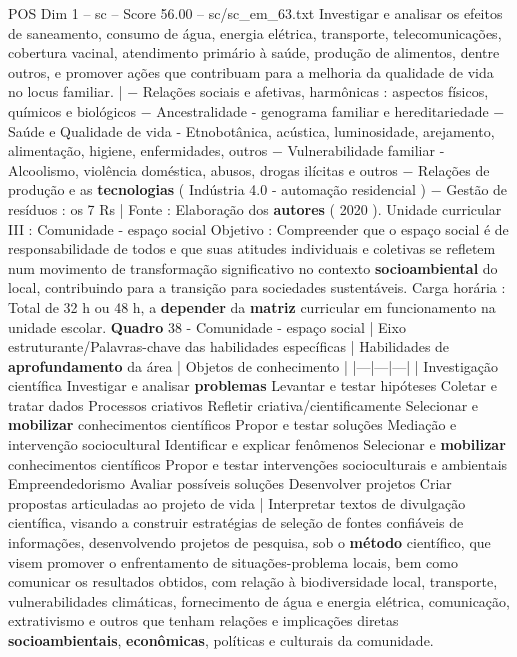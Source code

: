 \begin{textsample}{POS Dim 1 – sc – Score 56.00 – sc/sc\_em\_63.txt}
Investigar e analisar os efeitos de saneamento, consumo de água, energia elétrica, transporte, telecomunicações, cobertura vacinal, atendimento primário à saúde, produção de alimentos, dentre outros, e promover ações que contribuam para a melhoria da qualidade de vida no locus familiar. | − Relações sociais e afetivas, harmônicas : aspectos físicos, químicos e biológicos − Ancestralidade - genograma familiar e hereditariedade − Saúde e Qualidade de vida - Etnobotânica, acústica, luminosidade, arejamento, alimentação, higiene, enfermidades, outros − Vulnerabilidade familiar - Alcoolismo, violência doméstica, abusos, drogas ilícitas e outros − Relações de produção e as \textbf{tecnologias} ( Indústria 4.0 - automação residencial ) − Gestão de resíduos : os 7 Rs | Fonte : Elaboração dos \textbf{autores} ( 2020 ).
Unidade curricular III : Comunidade - espaço social Objetivo : Compreender que o espaço social é de responsabilidade de todos e que suas atitudes individuais e coletivas se refletem num movimento de transformação significativo no contexto \textbf{socioambiental} do local, contribuindo para a transição para sociedades sustentáveis.
Carga horária : Total de 32 h ou 48 h, a \textbf{depender} da \textbf{matriz} curricular em funcionamento na unidade escolar. \textbf{Quadro} 38 - Comunidade - espaço social | Eixo estruturante/Palavras-chave das habilidades específicas | Habilidades de \textbf{aprofundamento} da área | Objetos de conhecimento | |---|---|---| | Investigação científica Investigar e analisar \textbf{problemas} Levantar e testar hipóteses Coletar e tratar dados Processos criativos Refletir criativa/cientificamente Selecionar e \textbf{mobilizar} conhecimentos científicos Propor e testar soluções Mediação e intervenção sociocultural Identificar e explicar fenômenos Selecionar e \textbf{mobilizar} conhecimentos científicos Propor e testar intervenções socioculturais e ambientais Empreendedorismo Avaliar possíveis soluções Desenvolver projetos Criar propostas articuladas ao projeto de vida | Interpretar textos de divulgação científica, visando a construir estratégias de seleção de fontes confiáveis de informações, desenvolvendo projetos de pesquisa, sob o \textbf{método} científico, que visem promover o enfrentamento de situações-problema locais, bem como comunicar os resultados obtidos, com relação à biodiversidade local, transporte, vulnerabilidades climáticas, fornecimento de água e energia elétrica, comunicação, extrativismo e outros que tenham relações e implicações diretas \textbf{socioambientais}, \textbf{econômicas}, políticas e culturais da comunidade.

\end{textsample}
